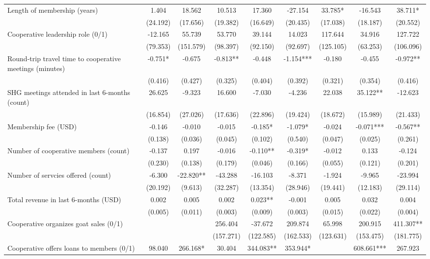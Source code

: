 \documentclass[11pt]{article}
\begin{document}
\begin{landscape}
\begin{table}[H]
{\begin{tabularx}{1.8\linewidth}{lcccccccc}
Length of membership (years) & 1.404 & 18.562 & 10.513 & 17.360 & -27.154 & 33.785* & -16.543 & 38.711* \\
 & (24.192) & (17.656) & (19.382) & (16.649) & (20.435) & (17.038) & (18.187) & (20.552) \\
Cooperative leadership role (0/1) & -12.165 & 55.739 & 53.770 & 39.144 & 14.023 & 117.644 & 34.916 & 127.722 \\
 & (79.353) & (151.579) & (98.397) & (92.150) & (92.697) & (125.105) & (63.253) & (106.096) \\
Round-trip travel time to cooperative meetings (minutes) & -0.751* & -0.675 & -0.813** & -0.448 & -1.154*** & -0.180 & -0.455 & -0.972** \\
 & (0.416) & (0.427) & (0.325) & (0.404) & (0.392) & (0.321) & (0.354) & (0.416) \\
SHG meetings attended in last 6-months (count) & 26.625 & -9.323 & 16.600 & -7.030 & -4.236 & 22.038 & 35.122** & -12.623 \\
 & (16.854) & (27.026) & (17.636) & (22.896) & (19.424) & (18.672) & (15.989) & (21.433) \\
Membership fee (USD) & -0.146 & -0.010 & -0.015 & -0.185* & -1.079* & -0.024 & -0.071*** & -0.567** \\
 & (0.138) & (0.036) & (0.045) & (0.102) & (0.540) & (0.047) & (0.025) & (0.261) \\
Number of cooperative members (count) & -0.137 & 0.197 & -0.016 & -0.110** & -0.319* & -0.012 & 0.133 & -0.124 \\
 & (0.230) & (0.138) & (0.179) & (0.046) & (0.166) & (0.055) & (0.121) & (0.201) \\
Number of servcies offered (count) & -6.300 & -22.820** & -43.288 & -16.103 & -8.371 & -1.924 & -9.965 & -23.994 \\
 & (20.192) & (9.613) & (32.287) & (13.354) & (28.946) & (19.441) & (12.183) & (29.114) \\
Total revenue in last 6-months (USD) & 0.002 & 0.005 & 0.002 & 0.023** & -0.001 & 0.005 & 0.032 & 0.004 \\
 & (0.005) & (0.011) & (0.003) & (0.009) & (0.003) & (0.015) & (0.022) & (0.004) \\
 Cooperative organizes goat sales (0/1) &  &  & 256.404 & -37.672 & 209.874 & 65.998 & 200.915 & 411.307** \\
 &  &  & (157.271) & (122.585) & (162.533) & (123.631) & (153.475) & (181.775) \\
Cooperative offers loans to members (0/1) & 98.040 & 266.168* & 30.404 & 344.083** & 353.944* &  & 608.661*** & 267.923 \\

\end{tabularx}}
\end{table}
\end{landscape}
\end{document}
